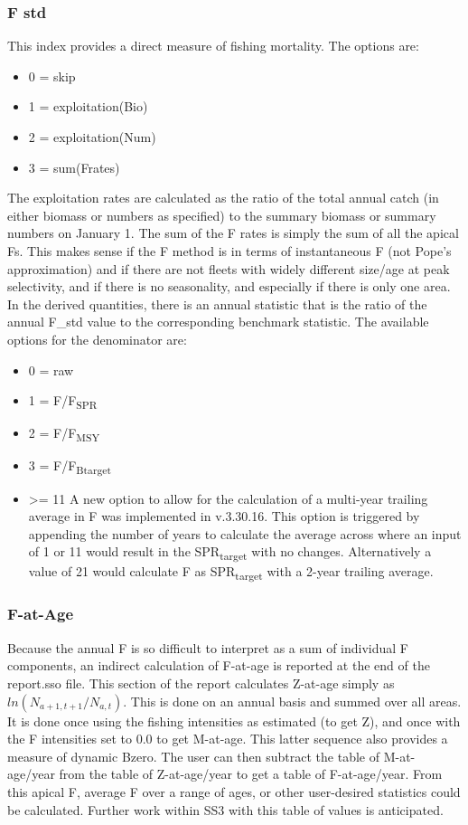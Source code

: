 \subsubsection{F std}
This index provides a direct measure of fishing mortality. The options are:
\begin{itemize}
	\item 0 = skip
	\item 1 = exploitation(Bio)
	\item 2 = exploitation(Num)
	\item 3 = sum(Frates)
\end{itemize}
The exploitation rates are calculated as the ratio of the total annual catch (in either biomass or numbers as specified) to the summary biomass or summary numbers on January 1. The sum of the F rates is simply the sum of all the apical Fs. This makes sense if the F method is in terms of instantaneous F (not Pope's approximation) and if there are not fleets with widely different size/age at peak selectivity, and if there is no seasonality, and especially if there is only one area. In the derived quantities, there is an annual statistic that is the ratio of the annual F\_std value to the corresponding benchmark statistic. The available options for the denominator are:
\begin{itemize}
	\item 0 = raw
	\item 1 = F/F\textsubscript {SPR}
	\item 2 = F/F\textsubscript {MSY}
	\item 3 = F/F\textsubscript {Btarget}
	\item >= 11  A new option to allow for the calculation of a multi-year trailing average in F was implemented in v.3.30.16. This option is triggered by appending the number of years to calculate the average across where an input of 1 or 11 would result in the SPR\textsubscript{target} with no changes. Alternatively a value of 21 would calculate F as SPR\textsubscript{target} with a 2-year trailing average.
\end{itemize}

\subsubsection{F-at-Age}
Because the annual F is so difficult to interpret as a sum of individual F components, an indirect calculation of F-at-age is reported at the end of the report.sso file. This section of the report calculates Z-at-age simply as $ln(N_{a+1,t+1}/N_{a,t})$. This is done on an annual basis and summed over all areas. It is done once using the fishing intensities as estimated (to get Z), and once with the F intensities set to 0.0 to get M-at-age. This latter sequence also provides a measure of dynamic Bzero. The user can then subtract the table of M-at-age/year from the table of Z-at-age/year to get a table of F-at-age/year. From this apical F, average F over a range of ages, or other user-desired statistics could be calculated. Further work within SS3 with this table of values is anticipated.


